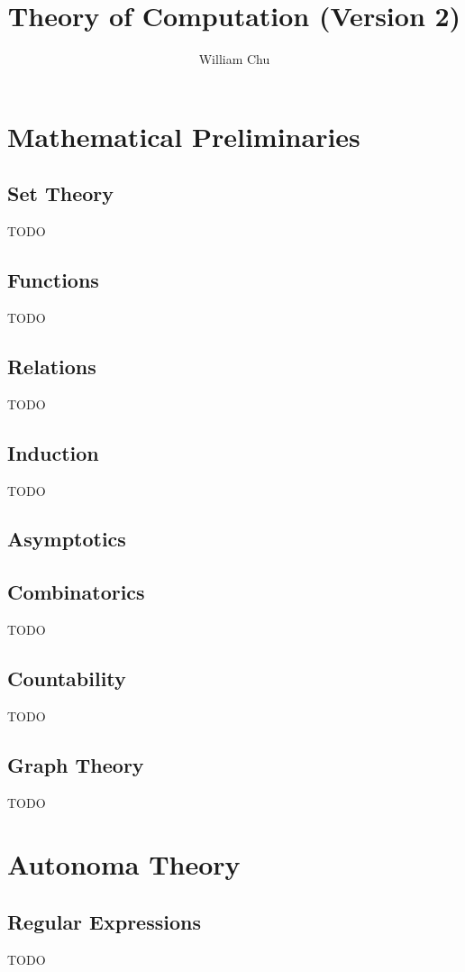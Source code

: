 \documentclass{article}
\title{Theory of Computation (Version 2)}
\author{William Chu}
\begin{document}
 
\maketitle
 
\tableofcontents
 
\section{Mathematical Preliminaries}
 
\subsection{Set Theory} 
TODO

\subsection{Functions}
TODO

\subsection{Relations}
TODO

\subsection{Induction}
TODO

\subsection{Asymptotics}

\subsection{Combinatorics}
TODO

\subsection{Countability}
TODO

\subsection{Graph Theory}
TODO


\section{Autonoma Theory}

\subsection{Regular Expressions}
TODO
 
\end{document}
